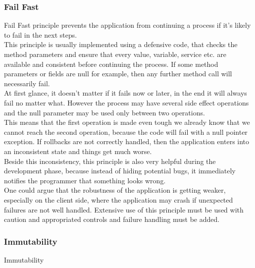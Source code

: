 \subsubsection{Fail Fast}
Fail Fast principle prevents the application from continuing a process if
it's likely to fail in the next steps. \\
\newline
This principle is usually implemented using a defensive code, that checks
the method parameters and ensure that every value, variable, service etc.
are available and consistent before continuing the process.
If some method parameters or fields are null for example, then any further
method call will necessarily fail. \\
\newline
At first glance, it doesn't matter if it fails now or later, in the end
it will always fail no matter what.
However the process may have several side effect operations and the null
parameter may be used only between two operations. \\
This means that the first operation is made even tough we already know
that we cannot reach the second operation, because the code will fail
with a null pointer exception.
If rollbacks are not correctly handled, then the application enters into
an inconsistent state and things get much worse. \\
\newline
Beside this inconsistency, this principle is also very helpful during
the development phase, because instead of hiding potential bugs, it
immediately notifies the programmer that something looks wrong. \\
One could argue that the robustness of the application is getting weaker,
especially on the client side, where the application may crash if
unexpected failures are not well handled.
Extensive use of this principle must be used with caution and
appropriated controls and failure handling must be added.

\subsubsection{Immutability}
Immutability


